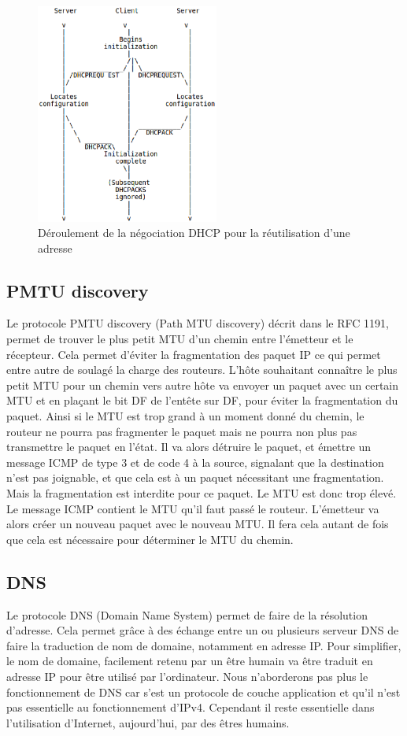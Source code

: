 \begin{figure}[h]
\centering
\includegraphics[width=6cm]{./pics/timeline_dhcp_reuse_add.eps}
\caption{Déroulement de la négociation DHCP pour la réutilisation d'une adresse}
\label{fig:timelinedhcpreuseadd}
\end{figure}

\subsection{PMTU discovery}
Le protocole PMTU discovery (Path MTU discovery) décrit dans le RFC 1191\cite{url-RFC-PMTU}, permet de trouver le plus petit MTU d'un chemin entre l'émetteur et le récepteur. Cela permet d'éviter la fragmentation des paquet IP ce qui permet entre autre de soulagé la charge des routeurs.
L'hôte souhaitant connaître le plus petit MTU pour un chemin vers autre hôte va envoyer un paquet avec un certain MTU et en plaçant le bit DF de l'entête sur DF, pour éviter la fragmentation du paquet. Ainsi si le MTU est trop grand à un moment donné du chemin, le routeur ne pourra pas fragmenter le paquet mais ne pourra non plus pas transmettre le paquet en l'état. Il va alors détruire le paquet, et émettre un message ICMP de type 3 et de code 4 à la source, signalant que la destination n'est pas joignable, et que cela est à un paquet nécessitant une fragmentation. Mais la fragmentation est interdite pour ce paquet. Le MTU est donc trop élevé. Le message ICMP contient le MTU qu'il faut passé le routeur.
L'émetteur va alors créer un nouveau paquet avec le nouveau MTU. Il fera cela autant de fois que cela est nécessaire pour déterminer le MTU du chemin.

\subsection{DNS}
Le protocole DNS (Domain Name System) permet de faire de la résolution d'adresse.
Cela permet grâce à des échange entre un ou plusieurs serveur DNS de faire la traduction
de nom de domaine, notamment en adresse IP. Pour simplifier, le nom de domaine, facilement
retenu par un être humain va être traduit en adresse IP pour être utilisé par l'ordinateur.
Nous n'aborderons pas plus le fonctionnement de DNS car s'est un protocole de couche application
et qu'il n'est pas essentielle au fonctionnement d'IPv4. Cependant il reste essentielle dans
l'utilisation d'Internet, aujourd'hui, par des êtres humains.
